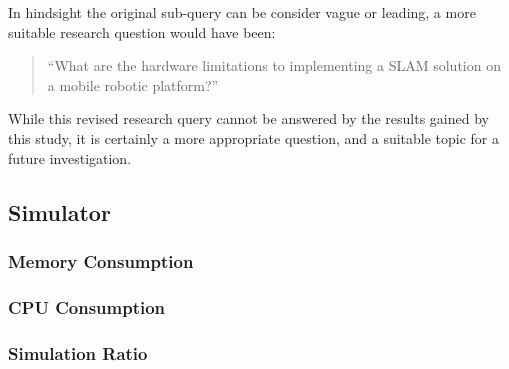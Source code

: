 In hindsight the original sub-query can be consider vague or leading, a more
suitable research question would have been:

\begin{quote}
``What are the hardware limitations to implementing a SLAM solution on a
mobile robotic platform?''
\end{quote}

While this revised research query cannot be answered by the results gained by
this study, it is certainly a more appropriate question, and a suitable topic
for a future investigation.


\subsection{Simulator}
\subsubsection{Memory Consumption}

\subsubsection{CPU Consumption}

\subsubsection{Simulation Ratio}
